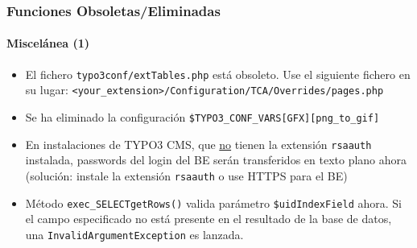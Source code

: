 \begin{frame}[fragile]
	\frametitle{Funciones Obsoletas/Eliminadas}
	\framesubtitle{Miscelánea (1)}

	\begin{itemize}

		\item El fichero \texttt{typo3conf/extTables.php} está obsoleto.\newline
			Use el siguiente fichero en su lugar:\newline
			\smaller\texttt{<your\_extension>/Configuration/TCA/Overrides/pages.php}\normalsize

		\item Se ha eliminado la configuración \texttt{\$TYPO3\_CONF\_VARS[GFX][png\_to\_gif]}

		\item En instalaciones de TYPO3 CMS, que \underline{no} tienen la extensión
			\texttt{rsaauth} instalada, passwords del login del BE serán transferidos en texto plano ahora\newline
			\small(solución: instale la extensión \texttt{rsaauth} o use HTTPS para el BE)\normalsize

		\item Método \texttt{exec\_SELECTgetRows()} valida parámetro \texttt{\$uidIndexField} ahora.
			Si el campo especificado no está presente en el resultado de la base de datos, una
			\texttt{InvalidArgumentException} es lanzada.

	\end{itemize}

\end{frame}


